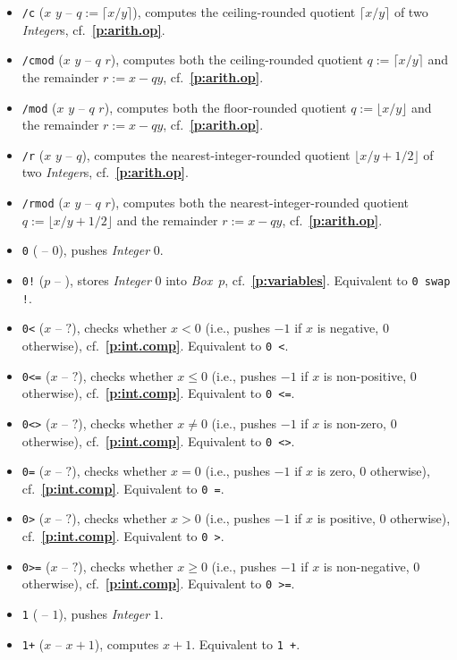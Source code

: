 \documentclass[12pt,oneside]{article}
\def\refpoint#1{{\rm\textbf{\ref{#1}}}}
\let\ptref=\refpoint
\begin{document}
\begin{itemize}
\item {\tt /c} ($x$ $y$ -- $q:=\lceil x/y\rceil$), computes the ceiling-rounded quotient $\lceil x/y\rceil$ of two {\em Integer\/}s, cf.~\ptref{p:arith.op}.
\item {\tt /cmod} ($x$ $y$ -- $q$ $r$), computes both the ceiling-rounded quotient $q:=\lceil x/y\rceil$ and the remainder $r:=x-qy$, cf.~\ptref{p:arith.op}.
\item {\tt /mod} ($x$ $y$ -- $q$ $r$), computes both the floor-rounded quotient $q:=\lfloor x/y\rfloor$ and the remainder $r:=x-qy$, cf.~\ptref{p:arith.op}.
\item {\tt /r} ($x$ $y$ -- $q$), computes the nearest-integer-rounded quotient $\lfloor x/y+1/2\rfloor$ of two {\em Integer\/}s, cf.~\ptref{p:arith.op}.
\item {\tt /rmod} ($x$ $y$ -- $q$ $r$), computes both the nearest-integer-rounded quotient $q:=\lfloor x/y+1/2\rfloor$ and the remainder $r:=x-qy$, cf.~\ptref{p:arith.op}.
\item {\tt 0} ( -- $0$), pushes {\em Integer\/} $0$.
\item {\tt 0!} ($p$ -- ), stores {\em Integer\/} $0$ into {\em Box\/}~$p$, cf.~\ptref{p:variables}. Equivalent to {\tt 0 swap !}.
\item {\tt 0<} ($x$ -- $?$), checks whether $x<0$ (i.e., pushes $-1$ if $x$ is negative, $0$ otherwise), cf.~\ptref{p:int.comp}. Equivalent to {\tt 0 <}.
\item {\tt 0<=} ($x$ -- $?$), checks whether $x\leq0$ (i.e., pushes $-1$ if $x$ is non-positive, $0$ otherwise), cf.~\ptref{p:int.comp}. Equivalent to {\tt 0 <=}.
\item {\tt 0<>} ($x$ -- $?$), checks whether $x\neq0$ (i.e., pushes $-1$ if $x$ is non-zero, $0$ otherwise), cf.~\ptref{p:int.comp}. Equivalent to {\tt 0 <>}.
\item {\tt 0=} ($x$ -- $?$), checks whether $x=0$ (i.e., pushes $-1$ if $x$ is zero, $0$ otherwise), cf.~\ptref{p:int.comp}. Equivalent to {\tt 0 =}.
\item {\tt 0>} ($x$ -- $?$), checks whether $x>0$ (i.e., pushes $-1$ if $x$ is positive, $0$ otherwise), cf.~\ptref{p:int.comp}. Equivalent to {\tt 0 >}.
\item {\tt 0>=} ($x$ -- $?$), checks whether $x\geq0$ (i.e., pushes $-1$ if $x$ is non-negative, $0$ otherwise), cf.~\ptref{p:int.comp}. Equivalent to {\tt 0 >=}.
\item {\tt 1} ( -- $1$), pushes {\em Integer\/} $1$.
\item {\tt 1+} ($x$ -- $x+1$), computes $x+1$. Equivalent to {\tt 1 +}.

\end{itemize}
\end{document}
